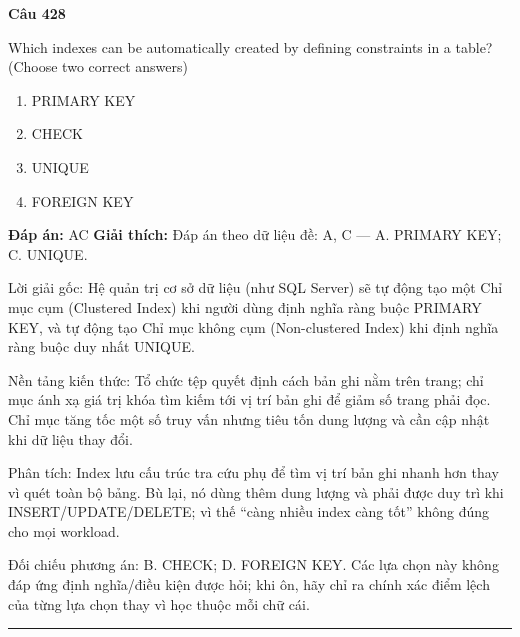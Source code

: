 \documentclass[11pt,a4paper]{article}
\newenvironment{question}[1]{%
  \par\vspace{1em}\noindent\textbf{\large Câu #1}\par\vspace{0.4em}
}{%
  \par\vspace{1em}\hrule\vspace{0.6em}
}
\newenvironment{choices}{%
  \begin{enumerate}[label=\textbf{\Alph*.},leftmargin=2.2em,itemsep=2pt,topsep=3pt]
}{%
  \end{enumerate}
}
\newcommand{\choice}{\item}
\begin{document}
\begin{question}{428}
Which indexes can be automatically created by defining constraints in a table? (Choose two correct answers)
\begin{choices}
\choice PRIMARY KEY
\choice CHECK
\choice UNIQUE
\choice FOREIGN KEY
\end{choices}
\textbf{Đáp án:} AC
\textbf{Giải thích:} Đáp án theo dữ liệu đề: A, C — A. PRIMARY KEY; C. UNIQUE.

Lời giải gốc: Hệ quản trị cơ sở dữ liệu (như SQL Server) sẽ tự động tạo một Chỉ mục cụm (Clustered Index) khi người dùng định nghĩa ràng buộc PRIMARY KEY, và tự động tạo Chỉ mục không cụm (Non-clustered Index) khi định nghĩa ràng buộc duy nhất UNIQUE.

Nền tảng kiến thức: Tổ chức tệp quyết định cách bản ghi nằm trên trang; chỉ mục ánh xạ giá trị khóa tìm kiếm tới vị trí bản ghi để giảm số trang phải đọc. Chỉ mục tăng tốc một số truy vấn nhưng tiêu tốn dung lượng và cần cập nhật khi dữ liệu thay đổi.

Phân tích: Index lưu cấu trúc tra cứu phụ để tìm vị trí bản ghi nhanh hơn thay vì quét toàn bộ bảng. Bù lại, nó dùng thêm dung lượng và phải được duy trì khi INSERT/UPDATE/DELETE; vì thế “càng nhiều index càng tốt” không đúng cho mọi workload.

Đối chiếu phương án: B. CHECK; D. FOREIGN KEY. Các lựa chọn này không đáp ứng định nghĩa/điều kiện được hỏi; khi ôn, hãy chỉ ra chính xác điểm lệch của từng lựa chọn thay vì học thuộc mỗi chữ cái.
\end{question}
\end{document}
